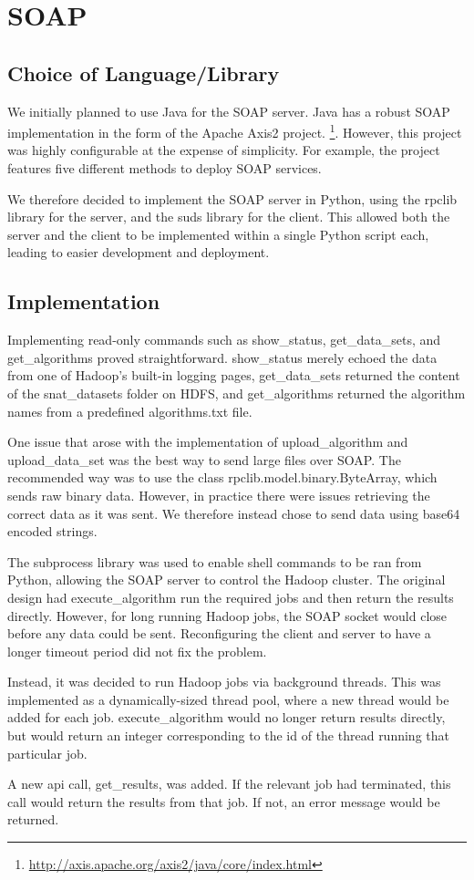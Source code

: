 \section{SOAP}

\subsection{Choice of Language/Library}

We initially planned to use Java for the SOAP server. Java has a robust SOAP implementation in the form of the Apache Axis2 project. \footnote{\url{http://axis.apache.org/axis2/java/core/index.html}}. However, this project was highly configurable at the expense of simplicity. For example, the project features five different methods to deploy SOAP services.

We therefore decided to implement the SOAP server in Python, using the rpclib library for the server, and the suds library for the client. This allowed both the server and the client to be implemented within a single Python script each, leading to easier development and deployment.

\subsection{Implementation}

Implementing read-only commands such as show\_status, get\_data\_sets, and get\_algorithms proved straightforward. show\_status merely echoed the data from one of Hadoop's built-in logging pages, get\_data\_sets returned the content of the snat\_datasets folder on HDFS, and get\_algorithms returned the algorithm names from a predefined algorithms.txt file.

One issue that arose with the implementation of upload\_algorithm and upload\_data\_set was the best way to send large files over SOAP. The recommended way was to use the class rpclib.model.binary.ByteArray, which sends raw binary data. However, in practice there were issues retrieving the correct data as it was sent. We therefore instead chose to send data using base64 encoded strings.

The subprocess library was used to enable shell commands to be ran from Python, allowing the SOAP server to control the Hadoop cluster. The original design had execute\_algorithm run the required jobs and then return the results directly. However, for long running Hadoop jobs, the SOAP socket would close before any data could be sent. Reconfiguring the client and server to have a longer timeout period did not fix the problem.

Instead, it was decided to run Hadoop jobs via background threads. This was implemented as a dynamically-sized thread pool, where a new thread would be added for each job. execute\_algorithm would no longer return results directly, but would return an integer corresponding to the id of the thread running that particular job.

A new api call, get\_results, was added. If the relevant job had terminated, this call would return the results from that job. If not, an error message would be returned.
